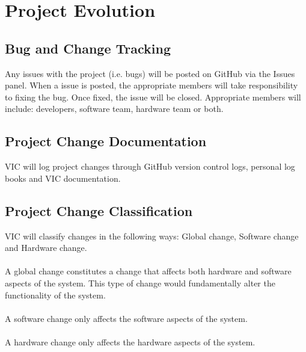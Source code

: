 \documentclass [12pt]{article}
\begin{document}
\section{Project Evolution}

\subsection{Bug and Change Tracking}
Any issues with the project (i.e. bugs) will  be posted on GitHub via the Issues panel. When a issue is posted, the appropriate members will take responsibility to fixing the bug. Once fixed, the issue will be closed. Appropriate members will include: developers, software team, hardware team or both. 

\subsection{Project Change Documentation}
VIC will log project changes through GitHub version control logs, personal log books and VIC documentation. 

\subsection{Project Change Classification}
VIC will classify changes in the following ways: Global change, Software change and Hardware change. \\\\
A global change constitutes a change that affects both hardware and software aspects of the system. This type of change would fundamentally alter the functionality of the system. \\ \\
A software change only affects the software aspects of the system. \\\\
A hardware change only affects the hardware aspects of the system. 


\end{document}
